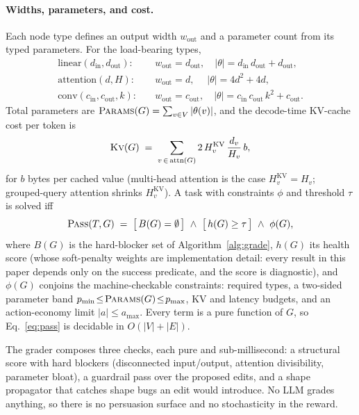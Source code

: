 \documentclass{article}
\begin{document}
\paragraph{Widths, parameters, and cost.} Each node type defines an output width $w_{\text{out}}$ and a parameter count from its typed parameters. For the load-bearing types,
\begin{align}
\text{linear}(d_{\text{in}}, d_{\text{out}})\!: &\quad w_{\text{out}} = d_{\text{out}}, \quad |\theta| = d_{\text{in}}\,d_{\text{out}} + d_{\text{out}}, \label{eq:lin}\\
\text{attention}(d, H)\!: &\quad w_{\text{out}} = d, \quad\; |\theta| = 4 d^2 + 4 d, \label{eq:attn}\\
\text{conv}(c_{\text{in}}, c_{\text{out}}, k)\!: &\quad w_{\text{out}} = c_{\text{out}}, \quad |\theta| = c_{\text{in}}\,c_{\text{out}}\,k^2 + c_{\text{out}}. \label{eq:conv}
\end{align}
Total parameters are $\textsc{Params}(G)=\sum_{v\in V}|\theta(v)|$, and the decode-time KV-cache cost per token is
\begin{equation}
\textsc{Kv}(G) \;=\; \sum_{v\,\in\,\text{attn}(G)} 2\,H^{\text{KV}}_v\,\frac{d_v}{H_v}\,b, \label{eq:kv}
\end{equation}
for $b$ bytes per cached value (multi-head attention is the case $H^{\text{KV}}_v = H_v$; grouped-query attention shrinks $H^{\text{KV}}_v$). A task with constraints $\phi$ and threshold $\tau$ is solved iff
\begin{equation}
\textsc{Pass}(T, G) \;=\; \big[\,B(G)=\emptyset\,\big]\ \wedge\ \big[\,h(G)\ge\tau\,\big]\ \wedge\ \phi(G), \label{eq:pass}
\end{equation}
where $B(G)$ is the hard-blocker set of Algorithm~\ref{alg:grade}, $h(G)$ its health score (whose soft-penalty weights are implementation detail: every result in this paper depends only on the success predicate, and the score is diagnostic), and $\phi(G)$ conjoins the machine-checkable constraints: required types, a two-sided parameter band $p_{\min}\!\le\!\textsc{Params}(G)\!\le\!p_{\max}$, KV and latency budgets, and an action-economy limit $|a|\le a_{\max}$. Every term is a pure function of $G$, so Eq.~\eqref{eq:pass} is decidable in $O(|V|+|E|)$.

The grader composes three checks, each pure and sub-millisecond: a structural score with hard blockers (disconnected input/output, attention divisibility, parameter bloat), a guardrail pass over the proposed edits, and a shape propagator that catches shape bugs an edit would introduce. No LLM grades anything, so there is no persuasion surface and no stochasticity in the reward.
\end{document}

